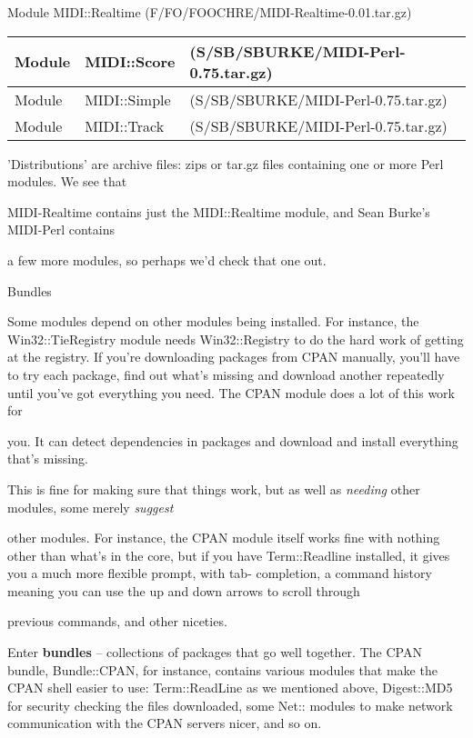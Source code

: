 \documentclass[a4paper,11pt]{book}
\begin{document}
Module MIDI::Realtime  (F/FO/FOOCHRE/MIDI-Realtime-0.01.tar.gz)

\begin{tabular}{|p{0.7in}|p{0.7in}|p{1.5in}|} \hline 
Module & MIDI::Score & (S/SB/SBURKE/MIDI-Perl-0.75.tar.gz) \\ \hline 
Module & MIDI::Simple & (S/SB/SBURKE/MIDI-Perl-0.75.tar.gz) \\ \hline 
Module & MIDI::Track & (S/SB/SBURKE/MIDI-Perl-0.75.tar.gz) \\ \hline 
\end{tabular}



\noindent 'Distributions' are archive files: zips or tar.gz files containing one or more Perl modules. We see that

\noindent MIDI-Realtime contains just the MIDI::Realtime module, and Sean Burke's MIDI-Perl contains

\noindent a few more modules, so perhaps we'd check that one out.

\noindent 

\noindent Bundles

\noindent 

\noindent Some modules depend on other modules being installed. For instance, the Win32::TieRegistry module needs Win32::Registry to do the hard work of getting at the registry. If you're downloading packages from CPAN manually, you'll have to try each package, find out what's missing and download another repeatedly until you've got everything you need. The CPAN module does a lot of this work for

\noindent you. It can detect dependencies in packages and download and install everything that's missing.

\noindent 

\noindent 

\noindent This is fine for making sure that things work, but as well as \textit{needing }other modules, some merely \textit{suggest}

\noindent other modules. For instance, the CPAN module itself works fine with nothing other than what's in the core, but if you have Term::Readline installed, it gives you a much more flexible prompt, with tab- completion, a command history meaning you can use the up and down arrows to scroll through

\noindent previous commands, and other niceties.

\noindent 

\noindent Enter \textbf{bundles }-- collections of packages that go well together. The CPAN bundle, Bundle::CPAN, for instance, contains various modules that make the CPAN shell easier to use: Term::ReadLine as we mentioned above, Digest::MD5 for security checking the files downloaded, some Net:: modules to make network communication with the CPAN servers nicer, and so on.
\end{document}
